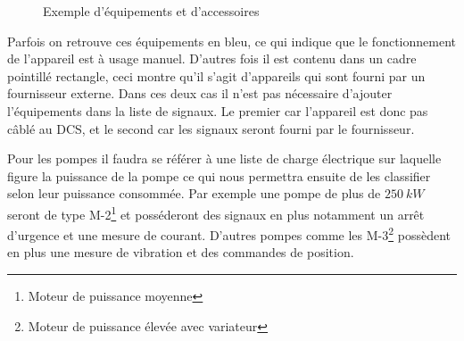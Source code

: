\documentclass[11pt, openright]{book}
\begin{document}
\begin{figure}[ht!]
    \caption{Exemple d'équipements et d'accessoires}
\end{figure}


Parfois on retrouve ces équipements en bleu, ce qui indique que le fonctionnement de l'appareil est à usage manuel. D'autres fois il est contenu dans un cadre pointillé rectangle, ceci montre qu'il s'agit d'appareils qui sont fourni par un fournisseur externe. Dans ces deux cas il n'est pas nécessaire d'ajouter l'équipements dans la liste de signaux. Le premier car l'appareil est donc pas câblé au DCS, et le second car les signaux seront fourni par le fournisseur.

Pour les pompes il faudra se référer à une liste de charge électrique sur laquelle figure la puissance de la pompe ce qui nous permettra ensuite de les classifier selon leur puissance consommée. Par exemple une pompe de plus de $250\ kW$ seront de type M-2\footnote{Moteur de puissance moyenne} et posséderont des signaux en plus notamment un arrêt d'urgence et une mesure de courant. D'autres pompes comme les M-3\footnote{Moteur de puissance élevée avec variateur} possèdent en plus une mesure de vibration et des commandes de position.
\end{document}
